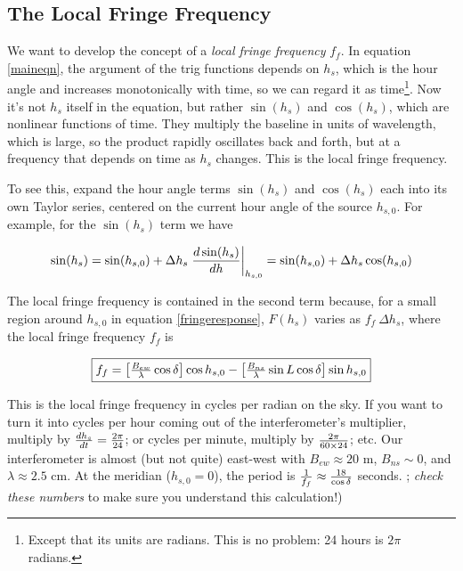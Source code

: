 \documentclass[11pt,preprint]{aastex}
\begin{document}
\subsection{The Local Fringe Frequency}
We want to develop the concept of a {\it local fringe frequency}
$f_f$. In equation \ref{maineqn}, the argument of the trig functions
depends on $h_s$, which is the hour angle and increases monotonically
with time, so we can regard it as time\footnote{Except that its units
  are radians. This is no problem: 24 hours is $2\pi$ radians.}. Now
it's not $h_s$ itself in the equation, but rather $\sin( h_s)$ and
$\cos(h_s)$, which are nonlinear functions of time. They multiply the
baseline in units of wavelength, which is large, so the product rapidly
oscillates back and forth, but at a frequency that depends on time as
$h_s$ changes.  This is the local fringe frequency.

To see this, expand the hour angle terms $\sin (h_s)$ and $\cos (h_s)$
each into its own Taylor series, centered on the current hour angle of the
source $h_{s,0}$. For example, for the $\sin(h_s)$ term we have

\begin{equation} \label{taylorexpansion}
\sin (h_s) = \sin( h_{s,0}) + 
  \Delta h_s \left. {d \sin(h_s) \over dh}\right|_{h_{s,0}} = 
\sin( h_{s,0}) + \Delta h_s \cos( h_{s,0}) 
\end{equation}

\noindent The local fringe frequency is contained in the second term
because, for a small region around $h_{s,0}$ in equation
\ref{fringeresponse}, $F(h_s)$ varies as $f_f \ \Delta h_s$, where  the
local fringe frequency $f_f$ is

\begin{equation} \label{fringefreq} \fbox{$
f_f = \left[{B_{ew} \over \lambda} \cos \delta \right] \cos h_{s,0} 
- \left[{B_{ns} \over \lambda} \sin L \cos \delta \right] \sin h_{s,0}
$}
\end{equation}

\noindent This is the local fringe frequency in cycles per radian on the
sky. If you want to turn it into cycles per hour coming out of the
interferometer's multiplier, multiply by ${dh_s \over dt} = {2\pi \over
  24}$; or cycles per minute, multiply by $2\pi \over 60 \times 24$;
etc. Our interferometer is almost (but not quite) east-west
with $B_{ew}\approx 20$ m, $B_{ns} \sim 0$, and $\lambda \approx 2.5$
cm. At the meridian ($h_{s,0}=0$), 
  the period is ${1 \over f_f} \approx
{18 \over \cos \delta}$ seconds. ; {\it check these numbers} to make sure you understand this
calculation!)
\end{document}
